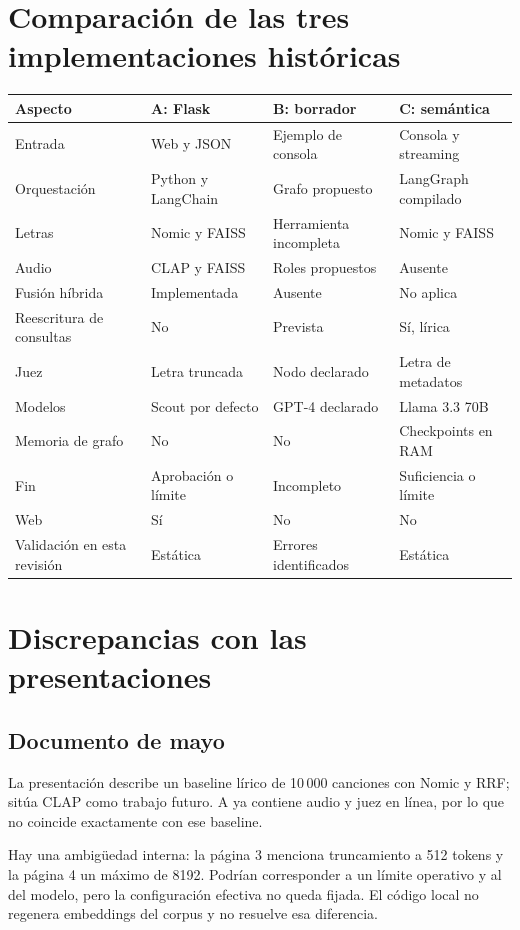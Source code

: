 \documentclass[11pt,a4paper]{article}
\begin{document}
\section{Comparación de las tres implementaciones históricas}
\small
\begin{longtable}{p{}p{}p{}p{}}
\toprule Aspecto & A: Flask & B: borrador & C: semántica\\\midrule\endhead
Entrada & Web y JSON & Ejemplo de consola & Consola y streaming\\
Orquestación & Python y LangChain & Grafo propuesto & LangGraph compilado\\
Letras & Nomic y FAISS & Herramienta incompleta & Nomic y FAISS\\
Audio & CLAP y FAISS & Roles propuestos & Ausente\\
Fusión híbrida & Implementada & Ausente & No aplica\\
Reescritura de consultas & No & Prevista & Sí, lírica\\
Juez & Letra truncada & Nodo declarado & Letra de metadatos\\
Modelos & Scout por defecto & GPT-4 declarado & Llama 3.3 70B\\
Memoria de grafo & No & No & Checkpoints en RAM\\
Fin & Aprobación o límite & Incompleto & Suficiencia o límite\\
Web & Sí & No & No\\
Validación en esta revisión & Estática & Errores identificados & Estática\\
\bottomrule
\end{longtable}
\normalsize

\section{Discrepancias con las presentaciones}
\subsection{Documento de mayo}
La presentación describe un baseline lírico de 10\,000 canciones con Nomic y RRF; sitúa CLAP como trabajo futuro. A ya contiene audio y juez en línea, por lo que no coincide exactamente con ese baseline.

Hay una ambigüedad interna: la página 3 menciona truncamiento a 512 tokens y la página 4 un máximo de 8192. Podrían corresponder a un límite operativo y al del modelo, pero la configuración efectiva no queda fijada. El código local no regenera embeddings del corpus y no resuelve esa diferencia.
\end{document}
